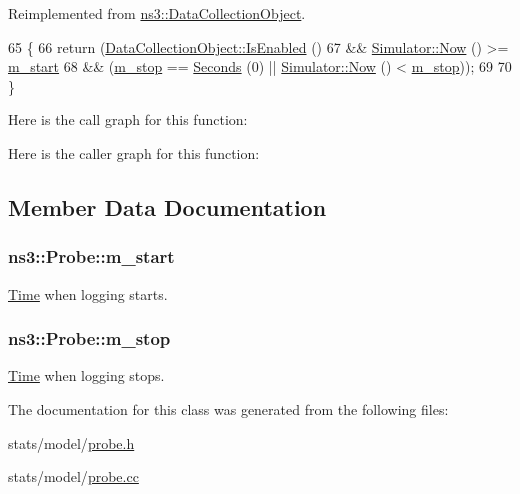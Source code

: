 Reimplemented from \hyperlink{classns3_1_1DataCollectionObject_aec77bad969d0ea340761535a2c58b3c9}{ns3\+::\+Data\+Collection\+Object}.


\begin{DoxyCode}
65 \{
66   \textcolor{keywordflow}{return} (\hyperlink{classns3_1_1DataCollectionObject_aec77bad969d0ea340761535a2c58b3c9}{DataCollectionObject::IsEnabled} ()
67           && \hyperlink{classns3_1_1Simulator_ac3178fa975b419f7875e7105be122800}{Simulator::Now} () >= \hyperlink{classns3_1_1Probe_a35ce721f5d9c0182d7c3fb02146d2d84}{m\_start}
68           && (\hyperlink{classns3_1_1Probe_a73219655953cf7dcebda11f593216070}{m\_stop} == \hyperlink{group__timecivil_ga33c34b816f8ff6628e33d5c8e9713b9e}{Seconds} (0) || \hyperlink{classns3_1_1Simulator_ac3178fa975b419f7875e7105be122800}{Simulator::Now} () < 
      \hyperlink{classns3_1_1Probe_a73219655953cf7dcebda11f593216070}{m\_stop}));
69 
70 \}
\end{DoxyCode}


Here is the call graph for this function\+:




Here is the caller graph for this function\+:




\subsection{Member Data Documentation}
\subsubsection[{\texorpdfstring{m\+\_\+start}{m_start}}]{ ns3\+::\+Probe\+::m\+\_\+start\hspace{0.3cm}{\ttfamily [protected]}}\hypertarget{classns3_1_1Probe_a35ce721f5d9c0182d7c3fb02146d2d84}{}\label{classns3_1_1Probe_a35ce721f5d9c0182d7c3fb02146d2d84}


\hyperlink{classns3_1_1Time}{Time} when logging starts. 

\subsubsection[{\texorpdfstring{m\+\_\+stop}{m_stop}}]{ ns3\+::\+Probe\+::m\+\_\+stop\hspace{0.3cm}{\ttfamily [protected]}}\hypertarget{classns3_1_1Probe_a73219655953cf7dcebda11f593216070}{}\label{classns3_1_1Probe_a73219655953cf7dcebda11f593216070}


\hyperlink{classns3_1_1Time}{Time} when logging stops. 



The documentation for this class was generated from the following files\+:\begin{DoxyCompactItemize}
\item 
stats/model/\hyperlink{probe_8h}{probe.\+h}\item 
stats/model/\hyperlink{probe_8cc}{probe.\+cc}\end{DoxyCompactItemize}

